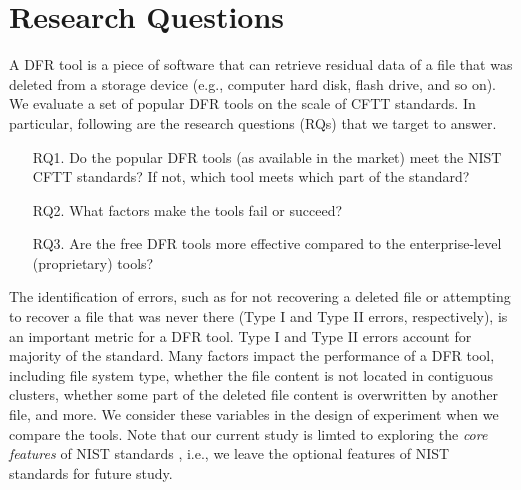 \section{Research Questions}

A DFR tool is a piece of software that can retrieve residual data of a file that was deleted 
from a storage device (e.g., computer hard disk, flash drive, and so on). We evaluate a set of 
popular DFR tools on the scale of CFTT standards. 
In particular, following are the research questions (RQs) that we target to answer. 

\begin{itemize}
\item[RQ1.] Do the popular DFR tools (as available in the market) meet the NIST CFTT standards? 
If not, which tool meets which part of the standard? 

\item[RQ2.] What factors make the tools fail or succeed?

\item[RQ3.] Are the free DFR tools more effective compared to the enterprise-level (proprietary) tools?
\end{itemize}

The identification of errors, such as for not recovering a deleted file or attempting to recover a file that was never there 
(Type I and Type II errors, respectively), is an important metric for a DFR tool. 
Type I and Type II errors account for majority of the standard. Many factors impact the performance of a DFR tool, 
including file system type, whether the file content is not located in contiguous clusters, whether 
some part of the deleted file content is overwritten by another file, and more.
We consider these variables in the design of experiment when we compare the tools.
Note that our current study is limted to exploring the \emph{core features} of NIST standards \cite{cftt:nist}, 
i.e., we leave the optional features \cite{cftt:nist} of NIST standards for future study.

